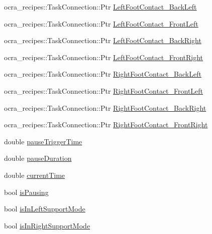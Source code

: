 \begin{DoxyCompactItemize}
\item 
ocra\-\_\-recipes\-::\-Task\-Connection\-::\-Ptr \hyperlink{classSteppingDemoClient_a5dd71720cd8f7a17d21f74d20b3c23ff}{\-Left\-Foot\-Contact\-\_\-\-Back\-Left}
\item 
ocra\-\_\-recipes\-::\-Task\-Connection\-::\-Ptr \hyperlink{classSteppingDemoClient_a32e69816ec216b3d6502385e2346d22d}{\-Left\-Foot\-Contact\-\_\-\-Front\-Left}
\item 
ocra\-\_\-recipes\-::\-Task\-Connection\-::\-Ptr \hyperlink{classSteppingDemoClient_a946ab9de6d55274e5cb9b9a8743a30b8}{\-Left\-Foot\-Contact\-\_\-\-Back\-Right}
\item 
ocra\-\_\-recipes\-::\-Task\-Connection\-::\-Ptr \hyperlink{classSteppingDemoClient_ae2c0ca1ba0ef69b5f09fd3cd982fb772}{\-Left\-Foot\-Contact\-\_\-\-Front\-Right}
\item 
ocra\-\_\-recipes\-::\-Task\-Connection\-::\-Ptr \hyperlink{classSteppingDemoClient_aaaf5dee15bf151def4b4070751d1ca84}{\-Right\-Foot\-Contact\-\_\-\-Back\-Left}
\item 
ocra\-\_\-recipes\-::\-Task\-Connection\-::\-Ptr \hyperlink{classSteppingDemoClient_ad10f639e025b003fd383f4cc933da15f}{\-Right\-Foot\-Contact\-\_\-\-Front\-Left}
\item 
ocra\-\_\-recipes\-::\-Task\-Connection\-::\-Ptr \hyperlink{classSteppingDemoClient_a93e209732588c3ef2b04e39e3df40d3e}{\-Right\-Foot\-Contact\-\_\-\-Back\-Right}
\item 
ocra\-\_\-recipes\-::\-Task\-Connection\-::\-Ptr \hyperlink{classSteppingDemoClient_a781be1c0ffd7e7147eb2b2de66ba3231}{\-Right\-Foot\-Contact\-\_\-\-Front\-Right}
\item 
double \hyperlink{classSteppingDemoClient_a13a5deff16d52936f788bb9b0af6e9c9}{pause\-Trigger\-Time}
\item 
double \hyperlink{classSteppingDemoClient_a92b810b2d2c50e359da18e5d91163340}{pause\-Duration}
\item 
double \hyperlink{classSteppingDemoClient_a1bb7d42cf09778349ae1ecd31d2ac116}{current\-Time}
\item 
bool \hyperlink{classSteppingDemoClient_a29e7765300c7d2e2d5108025fbdcbc2c}{is\-Pausing}
\item 
bool \hyperlink{classSteppingDemoClient_a88b84ed8fc7808ea3fb68f2ec3d29ebe}{is\-In\-Left\-Support\-Mode}
\item 
bool \hyperlink{classSteppingDemoClient_a7697070e5db6c635aa2eff70bce29176}{is\-In\-Right\-Support\-Mode}
\item 

\end{DoxyCompactItemize}
